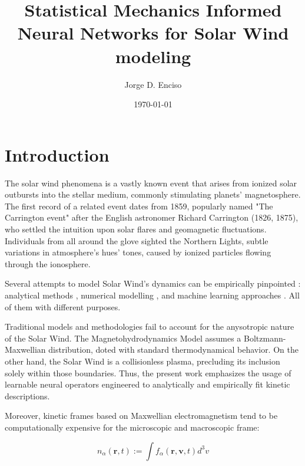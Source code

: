 \documentclass[12pt]{article}
\title{Statistical Mechanics Informed Neural Networks for Solar Wind modeling}
\author{Jorge D. Enciso}
\date{\today}
\begin{document}
\maketitle

\begin{abstract}
\end{abstract}

\tableofcontents
\newpage

\section{Introduction}

The solar wind phenomena is a vastly known event that arises from ionized solar outbursts into the stellar medium, commonly stimulating planets' magnetosphere. \cite{Gosling2007} The first record of a related event dates from 1859, popularly named "The Carrington event" after the English astronomer Richard Carrington (1826, 1875), who settled the intuition upon solar flares and geomagnetic fluctuations. Individuals from all around the glove sighted the Northern Lights, subtle variations in atmosphere's hues' tones, caused by ionized particles flowing through the ionosphere.

Several attempts to model Solar Wind's dynamics can be empirically pinpointed : analytical methods \cite{BLUME202396}, numerical modelling \cite{10.3389/fspas.2023.1105797, windmodelling1, Gombosi_2018}, and machine learning approaches \cite{comp_2, comp_3, guastavino2024forecastinggeoffectiveeventssolar, sabbatini2023solarwindspeedestimate, https://doi.org/10.1029/2023SW003561}. All of them with different purposes.

Traditional models and methodologies fail to account for the anysotropic nature of the Solar Wind. The Magnetohydrodynamics Model assumes a Boltzmann-Maxwellian distribution, doted with standard thermodynamical behavior. On the other hand, the Solar Wind is a collisionless plasma, precluding its inclusion solely within those boundaries. Thus, the present work emphasizes the usage of learnable neural operators engineered to analytically and empirically fit kinetic descriptions.

Moreover, kinetic frames based on Maxwellian electromagnetism tend to be computationally expensive for the microscopic and macroscopic frame:

\begin{equation}
    n_{\alpha} (\mathbf{r}, t) := \int f_{\alpha}(\mathbf{r}, \mathbf{v}, t) d^3v
\end{equation}
\end{document}
